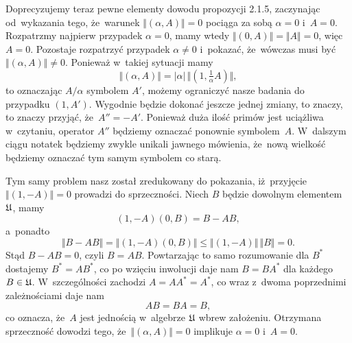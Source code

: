 \documentclass[a4paper,11pt]{article}
\begin{document}
Doprecyzujemy teraz pewne elementy dowodu propozycji 2.1.5, zaczynając
od~wykazania tego, że~warunek $\Vert ( \alpha, A ) \Vert = 0$ pociąga za sobą $\alpha = 0$
i~$A = 0$. Rozpatrzmy najpierw przypadek $\alpha = 0$, mamy wtedy
$\Vert ( 0, A ) \Vert = \Vert A \Vert = 0$, więc $A = 0$. Pozostaje rozpatrzyć przypadek
$\alpha \neq 0$ i~pokazać, że~wówczas musi być $\Vert ( \alpha, A ) \Vert \neq 0$. Ponieważ w~takiej
sytuacji mamy
\begin{equation}
  \label{eq:Bratteli-Robinson-Operator-Algebras-ETC-Vol-I-s01-11}
  \Vert ( \alpha, A ) \Vert = | \alpha | \, \Vert ( 1, \tfrac{ 1 }{ \alpha } A ) \Vert,
\end{equation}
to oznaczając $A / \alpha$ symbolem $A'$, możemy ograniczyć nasze badania
do przypadku $( 1, A' )$. Wygodnie będzie dokonać jeszcze jednej zmiany, to
znaczy, to znaczy przyjąć, że~$A'' = -A'$. Ponieważ duża ilość primów jest
uciążliwa w~czytaniu, operator $A''$ będziemy oznaczać ponownie
symbolem~$A$. W~dalszym ciągu notatek będziemy zwykle unikali jawnego
mówienia, że~nową wielkość będziemy oznaczać tym samym symbolem co starą.

Tym samy problem nasz został zredukowany do pokazania, iż~przyjęcie
$\Vert ( 1, -A ) \Vert = 0$ prowadzi do sprzeczności. Niech $B$ będzie dowolnym
elementem $\mathfrak{U}$, mamy
\begin{equation}
  \label{eq:Bratteli-Robinson-Operator-Algebras-ETC-Vol-I-s01-12}
  ( 1, -A ) ( 0, B ) = B - AB,
\end{equation}
a~ponadto
\begin{equation}
  \label{eq:Bratteli-Robinson-Operator-Algebras-ETC-Vol-I-s01-13}
  \Vert B - A B \Vert =
  \Vert ( 1, -A ) ( 0, B ) \Vert \leq
  \Vert ( 1, -A ) \Vert \, \Vert B \Vert = 0.
\end{equation}
Stąd $B - A B = 0$, czyli $B = A B$. Powtarzając to samo rozumowanie dla
$B^{ * }$ dostajemy $B^{ * } = A B^{ * }$, co po wzięciu inwolucji daje nam
$B = B A^{ * }$ dla każdego $B \in \mathfrak{U}$. W~szczególności zachodzi
$A = A A^{ * } = A^{ * }$, co wraz z~dwoma poprzednimi zależnościami daje nam
\begin{equation}
  \label{eq:Bratteli-Robinson-Operator-Algebras-ETC-Vol-I-s01-14}
  A B = B A = B,
\end{equation}
co oznacza, że~$A$ jest jednością w~algebrze $\mathfrak{U}$ wbrew założeniu.
Otrzymana sprzeczność dowodzi tego, że~$\Vert ( \alpha, A ) \Vert = 0$ implikuje
$\alpha = 0$ i~$A = 0$.

\VerSpaceFour
\end{document}

